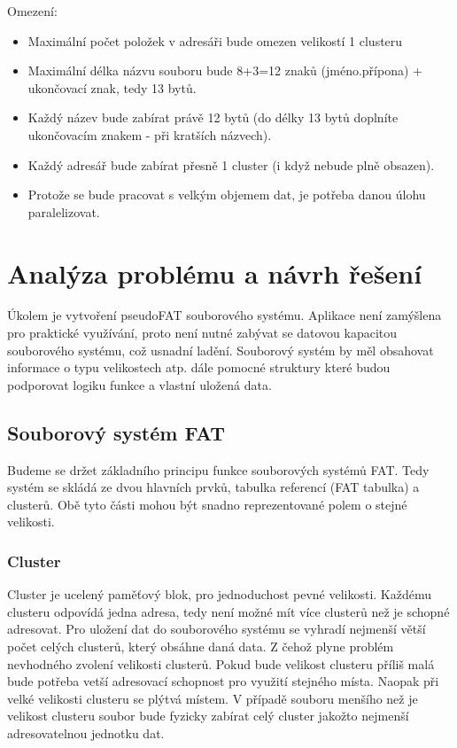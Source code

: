 \documentclass[12pt]{article}
\begin{document}
Omezení:
\begin{itemize}
\item Maximální počet položek v adresáři bude omezen velikostí 1 clusteru

\item Maximální délka názvu souboru bude 8+3=12 znaků (jméno.přípona) + ukončovací znak, tedy 13 bytů.

\item Každý název bude zabírat právě 12 bytů (do délky 13 bytů doplníte ukončovacím znakem - při kratších názvech).

\item Každý adresář bude zabírat přesně 1 cluster (i když nebude plně obsazen).

\item Protože se bude pracovat s velkým objemem dat, je potřeba danou úlohu paralelizovat.
\end{itemize}

\pagebreak

\section{Analýza problému a návrh řešení}
Úkolem je vytvoření pseudoFAT souborového systému. Aplikace není zamýšlena pro praktické využívání, proto není nutné zabývat se datovou kapacitou souborového systému, což usnadní ladění. Souborový systém by měl obsahovat informace o typu velikostech atp. dále pomocné struktury které budou podporovat logiku funkce a vlastní uložená data.

\subsection{Souborový systém FAT}
Budeme se držet základního principu funkce souborových systémů FAT. Tedy systém se skládá ze dvou hlavních prvků, tabulka referencí (FAT tabulka) a clusterů. Obě tyto části mohou být snadno reprezentované polem o stejné velikosti.

\subsubsection{Cluster}
Cluster je ucelený paměťový blok, pro jednoduchost pevné velikosti. Každému clusteru odpovídá jedna adresa, tedy není možné mít více clusterů než je schopné adresovat. Pro uložení dat do souborového systému se vyhradí nejmenší větší počet celých clusterů, který obsáhne daná data. Z čehož plyne problém nevhodného zvolení velikosti clusterů. Pokud bude velikost clusteru příliš malá bude potřeba vetší adresovací schopnost pro využití stejného místa. Naopak při velké velikosti clusteru se plýtvá místem. V případě souboru menšího než je velikost clusteru soubor bude fyzicky zabírat celý cluster jakožto nejmenší adresovatelnou jednotku dat.
\end{document}
